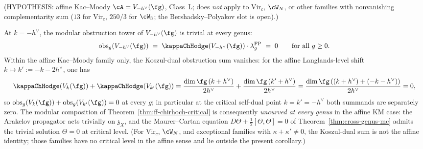 \begin{corollary}
\label{cor:kappa-zero-crit}
\textup{(}\textsf{HYPOTHESIS}: affine Kac--Moody $\cA = V_{-h^\vee}(\fg)$,
Class~L; does \emph{not} apply to Vir$_c$, $\cW_N$, or other
families with nonvanishing complementarity sum
($13$ for Vir$_c$, $250/3$ for $\cW_3$; the
Bershadsky--Polyakov slot is open).\textup{)}%
\par\smallskip\noindent
At $k=-h^\vee$, the modular obstruction tower of $V_{-h^\vee}(\fg)$
is trivial at every genus:
\[
 \operatorname{obs}_g(V_{-h^\vee}(\fg))
 \;=\; \kappaChHodge(V_{-h^\vee}(\fg))\cdot\lambda_g^{\mathrm{FP}}
 \;=\; 0 \qquad\text{for all } g \ge 0.
\]
Within the affine Kac--Moody family only, the
Koszul-dual obstruction sum vanishes: for the affine Langlands-level
shift $k \mapsto k' := -k-2h^\vee$, one has
\[
\kappaChHodge(V_k(\fg)) + \kappaChHodge(V_{k'}(\fg))
= \frac{\dim\fg\,(k+h^\vee)}{2h^\vee}
 + \frac{\dim\fg\,(k'+h^\vee)}{2h^\vee}
= \frac{\dim\fg\,((k+h^\vee)+(-k-h^\vee))}{2h^\vee}
= 0,
\]
so $\operatorname{obs}_g(V_k(\fg)) + \operatorname{obs}_g(V_{k'}(\fg))
= 0$ at every $g$; in particular at the critical self-dual point
$k = k' = -h^\vee$ both summands are separately zero. The modular
composition of Theorem~\textup{\ref{thm:ff-chirhoch-critical}} is
consequently \emph{uncurved at every genus} in the affine KM case:
the Arakelov propagator acts trivially on $\mathfrak{z}_X$, and the
Maurer--Cartan equation $D\Theta + \tfrac12[\Theta,\Theta] = 0$ of
Theorem~\textup{\ref{thm:cross-genus-mc}} admits the trivial solution
$\Theta = 0$ at critical level. (For Vir$_c$, $\cW_N$, and exceptional
families with $\kappa + \kappa' \ne 0$, the Koszul-dual sum is not
the affine identity; those families have no critical level in the
affine sense and lie outside the present corollary.)
\end{corollary}

